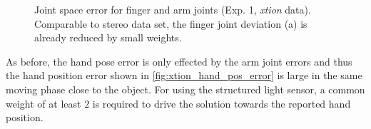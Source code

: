 \begin{figure}[h]
\centering
{}
%
\caption{Joint space error for finger and arm joints (Exp. 1, \textit{xtion} data). Comparable to stereo data set, the finger joint deviation (a) is already reduced by small weights.}
\label{fig:xtion_joint_error}
\end{figure}

As before, the hand pose error is only effected by the arm joint errors and thus the hand position error shown in \cref{fig:xtion_hand_pos_error} is large in the same moving phase close to the object. For using the structured light sensor, a common weight of at least $2$ is required to drive the solution towards the reported hand position.

